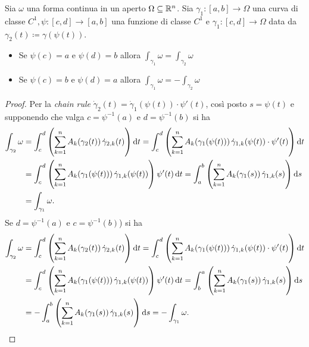 \begin{thm}
	Sia $ \omega $ una forma continua in un aperto $ \Omega \subseteq \mathbb{R}^n $. Sia $ \gamma_1 \colon [a, b] \to \Omega $ una curva di classe $ C^1, \psi \colon [c, d] \to [a, b] $ una funzione di classe $ C^1 $ e $ \gamma_1 \colon [c, d] \to \Omega $ data da $ \gamma_2(t) \coloneqq \gamma(\psi(t)) $.
	\begin{itemize}
		\item Se $ \psi(c) = a $ e $ \psi(d) = b $ allora $ \int_{\gamma_1} \omega = \int_{\gamma_2} \omega $
		\item Se $ \psi(c) = b $ e $ \psi(d) = a $ allora $ \int_{\gamma_1} \omega = - \int_{\gamma_2} \omega $
	\end{itemize}
\end{thm}
%
\begin{proof}
	Per la \emph{chain rule} $ \dot{\gamma}_2(t) = \dot{\gamma}_1(\psi(t)) \cdot \psi'(t) $, così posto $ s = \psi(t) $ e supponendo che valga $ c = \psi^{-1}(a) $ e $ d = \psi^{-1}(b) $ si ha
	\begin{align*}
		\int_{\gamma_2} \omega & = \int_{c}^{d} \left(\sum_{k = 1}^{n} A_k(\gamma_2(t)) \, \dot{\gamma}_{2, k}(t)\right) \dif{t}
		= \int_{c}^{d} \left(\sum_{k = 1}^{n} A_k(\gamma_1(\psi(t))) \, \dot{\gamma}_{1, k}(\psi(t)) \cdot \psi'(t)\right) \dif{t} \\
		& = \int_{c}^{d} \left(\sum_{k = 1}^{n} A_k(\gamma_1(\psi(t))) \, \dot{\gamma}_{1, k}(\psi(t))\right) \psi'(t) \dif{t} = \int_{a}^{b} \left(\sum_{k = 1}^{n} A_k(\gamma_1(s)) \, \dot{\gamma}_{1, k}(s)\right) \dif{s} \\
		& = \int_{\gamma_1} \omega.
	\end{align*}
	Se $ d = \psi^{-1}(a) $ e $ c = \psi^{-1}(b) $) si ha
	\begin{align*}
		\int_{\gamma_2} \omega & = \int_{c}^{d} \left(\sum_{k = 1}^{n} A_k(\gamma_2(t)) \, \dot{\gamma}_{2, k}(t)\right) \dif{t}
		= \int_{c}^{d} \left(\sum_{k = 1}^{n} A_k(\gamma_1(\psi(t))) \, \dot{\gamma}_{1, k}(\psi(t)) \cdot \psi'(t)\right) \dif{t} \\
		& = \int_{c}^{d} \left(\sum_{k = 1}^{n} A_k(\gamma_1(\psi(t))) \, \dot{\gamma}_{1, k}(\psi(t))\right) \psi'(t) \dif{t} = \int_{b}^{a} \left(\sum_{k = 1}^{n} A_k(\gamma_1(s)) \, \dot{\gamma}_{1, k}(s)\right) \dif{s} \\
		& = - \int_{a}^{b} \left(\sum_{k = 1}^{n} A_k(\gamma_1(s)) \, \dot{\gamma}_{1, k}(s)\right) \dif{s} = - \int_{\gamma_1} \omega.\qedhere
	\end{align*}
\end{proof}

